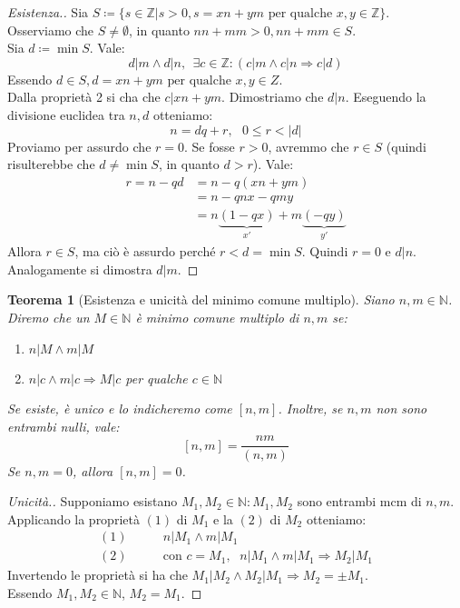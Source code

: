 \documentclass[12pt,twoscolu]{article}
\newcommand{\N}{\mathbb{N}}
\newcommand{\Z}{\mathbb{Z}}
\newcommand{\implica}{\Longrightarrow}
\newcommand{\pq}{\text{ per qualche }}
\renewcommand\qedsymbol{$\blacksquare$}
\newtheorem{theorem}{Teorema}
\begin{document}
\renewcommand\qedsymbol{$\blacksquare$}
\begin{proof}[Esistenza.]
Sia $S \coloneqq \{ s \in \Z | s > 0, s = xn + ym \text{ per qualche } x, y \in \Z\}$.
\\Osserviamo che $S \ne \emptyset$, in quanto $nn + mm > 0, nn + mm \in S$.
\\Sia $d \coloneqq \min S$. Vale:
$$ d | m \land d | n ,\ \ \exists c \in \Z : (c | m \land c | n \implica c | d)$$
Essendo $d \in S, d = xn+ym \pq x, y \in Z$.
\\Dalla proprietà 2 si cha che $c | xn + ym$. Dimostriamo che $d | n$. Eseguendo la divisione euclidea tra $n, d$ otteniamo:
$$n = dq + r, \text{ } 0 \le r < |d|$$
Proviamo per assurdo che $r = 0$. Se fosse $r > 0$, avremmo che $r \in S$ (quindi risulterebbe che $d \ne \min S$, in quanto $d > r$). Vale:
\begin{align*} 
r = n - qd &= n - q(xn+ym) \\
&= n - qnx - qmy \\
&= n\underbrace{(1-qx)}_{x'} + m\underbrace{(-qy)}_{y'}
\end{align*}
Allora $r \in S$, ma ciò è assurdo perché $r < d = \min S$. Quindi $r = 0$ e $d|n$. Analogamente si dimostra $d | m$.
\end{proof}

\begin{theorem}[Esistenza e unicità del minimo comune multiplo]
Siano $n, m \in \N$. Diremo che un $M \in \N$ è minimo comune multiplo di $n, m$ se:
\begin{enumerate}
\item$n | M \land m | M $
\item$n | c \land m | c \implica M | c$ per qualche $c \in \N$
\end{enumerate}
Se esiste, è unico e lo indicheremo come $[n, m]$. Inoltre, se $n, m$ non sono entrambi nulli, vale:
$$[n, m] = \frac{nm}{(n, m)}$$
Se $n, m = 0$, allora $ [n, m] = 0$.
\end{theorem}

\renewcommand\qedsymbol{$\square$}
\begin{proof}[Unicità.]
Supponiamo esistano $M_1, M_2 \in \N : M_1, M_2$ sono entrambi mcm di $n, m$.
Applicando la proprietà $(1)$ di $M_1$ e la $(2)$ di $M_2$ otteniamo:
\begin{align*}
(1)\qquad& n | M_1 \land m | M_1 \\
(2)\qquad&\text{con } c = M_1 \text{, } \ \ n | M_1 \land m | M_1 \implica M_2 | M_1
\end{align*}
Invertendo le proprietà si ha che $M_1 | M_2 \land M_2 | M_1 \implica M_2 = \pm M_1$.
\\Essendo $M_1, M_2 \in \N$, $M_2 = M_1$.
\end{proof}
\end{document}
